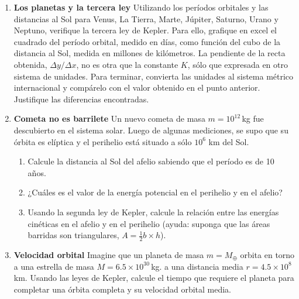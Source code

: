 \documentclass[a4paper,12pt]{article}
\begin{document}
\begin{enumerate}
	\item{\bf{Los planetas y la tercera ley}}
		Utilizando los períodos orbitales y las distancias al Sol para Venus,
		La Tierra, Marte, Júpiter, Saturno, Urano y Neptuno, verifique la
		tercera ley de Kepler. Para ello, grafique en excel el cuadrado del
		período orbital, medido en días, como función del cubo de la distancia
		al Sol, medida en millones de kilómetros. La pendiente de la recta
		obtenida, $\Delta y / \Delta x$, no es otra que la constante $K$, sólo
		que expresada en otro sistema de unidades.  Para terminar, convierta
		las unidades al sistema métrico internacional y compárelo con el valor
		obtenido en el punto anterior. Justifique las diferencias encontradas.
	
	\item{\bf{Cometa no es barrilete}}
		Un nuevo cometa de masa $m=10^{12}$\,kg fue descubierto en el sistema
		solar. Luego de algunas mediciones, se supo que su órbita es elíptica
		y el perihelio está situado a sólo $10^6$ km del Sol.
		\begin{enumerate}
			\item Calcule la distancia al Sol del afelio sabiendo que el
				período es de 10 años.
			\item ¿Cuáles es el valor de la energía potencial en el perihelio y
				en el afelio?
			\item Usando la segunda ley de Kepler, calcule la relación entre
				las energías cinéticas en el afelio y en el perihelio (ayuda:
				suponga que las áreas barridas son triangulares, $A=\frac{1}{2}
				b \times h$).
		\end{enumerate}
	\item{\bf{Velocidad orbital}} Imagine que un planeta de masa $m=M_\oplus$
		orbita en torno a una estrella de masa $M=6.5 \times 10^{30}$\,kg. a
		una distancia media $r=4.5\times10^8$\,km. Usando las leyes de Kepler,
		calcule el tiempo que requiere el planeta para completar una órbita
		completa y su velocidad orbital media.
	

\end{enumerate}
\end{document}
